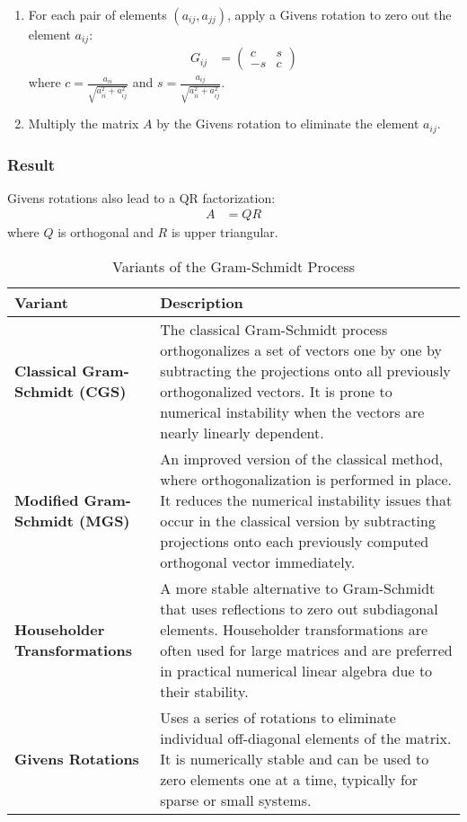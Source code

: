 \documentclass[article]{IEEEtran}
\numberwithin{equation}{enumi}
\numberwithin{figure}{enumi}
\begin{document}
\begin{enumerate}
    \item For each pair of elements $ (a_{ij}, a_{jj}) $, apply a Givens rotation to zero out the element $ a_{ij} $:
    \begin{align*}
    G_{ij} &= \begin{pmatrix} c & s \\ -s & c \end{pmatrix}
    \end{align*}
    where $ c = \frac{a_{ii}}{\sqrt{a_{ii}^2 + a_{ij}^2}} $ and $ s = \frac{a_{ij}}{\sqrt{a_{ii}^2 + a_{ij}^2}} $.
    \item Multiply the matrix $ A $ by the Givens rotation to eliminate the element $ a_{ij} $.
\end{enumerate}

\subsubsection{Result}
Givens rotations also lead to a QR factorization:
\begin{align*}
A &= QR
\end{align*}
where $ Q $ is orthogonal and $ R $ is upper triangular.

\begin{table}[H]
\centering
\begin{tabular}{|>{\raggedright}m{3cm}|m{6cm}|}
\hline
\textbf{Variant} & \textbf{Description} \\
\hline
\textbf{Classical Gram-Schmidt (CGS)} & 
The classical Gram-Schmidt process orthogonalizes a set of vectors one by one by subtracting the projections onto all previously orthogonalized vectors. It is prone to numerical instability when the vectors are nearly linearly dependent. \\
\hline
\textbf{Modified Gram-Schmidt (MGS)} & 
An improved version of the classical method, where orthogonalization is performed in place. It reduces the numerical instability issues that occur in the classical version by subtracting projections onto each previously computed orthogonal vector immediately. \\
\hline
\textbf{Householder Transformations} & 
A more stable alternative to Gram-Schmidt that uses reflections to zero out subdiagonal elements. Householder transformations are often used for large matrices and are preferred in practical numerical linear algebra due to their stability. \\
\hline
\textbf{Givens Rotations} & 
Uses a series of rotations to eliminate individual off-diagonal elements of the matrix. It is numerically stable and can be used to zero elements one at a time, typically for sparse or small systems. \\
\hline
\end{tabular}
\caption{Variants of the Gram-Schmidt Process}
\end{table}
\pagebreak
\end{document}

